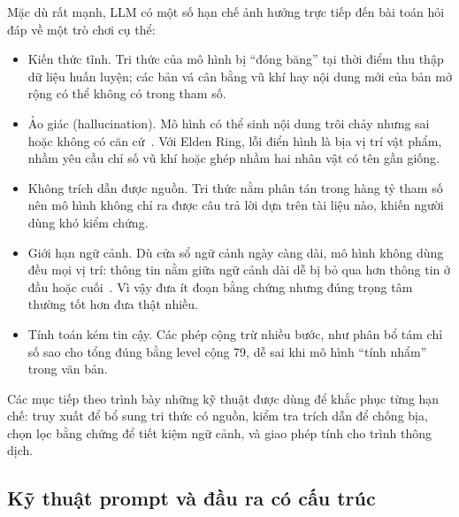 Mặc dù rất mạnh, LLM có một số hạn chế ảnh hưởng trực tiếp đến bài toán hỏi đáp về một trò chơi cụ thể:
\begin{itemize}
    \item Kiến thức tĩnh. Tri thức của mô hình bị ``đóng băng'' tại thời điểm thu thập dữ liệu huấn luyện; các bản vá cân bằng vũ khí hay nội dung mới của bản mở rộng có thể không có trong tham số.
    \item Ảo giác (hallucination). Mô hình có thể sinh nội dung trôi chảy nhưng sai hoặc không có căn cứ~\cite{ji2023hallucination}. Với Elden Ring, lỗi điển hình là bịa vị trí vật phẩm, nhầm yêu cầu chỉ số vũ khí hoặc ghép nhầm hai nhân vật có tên gần giống.
    \item Không trích dẫn được nguồn. Tri thức nằm phân tán trong hàng tỷ tham số nên mô hình không chỉ ra được câu trả lời dựa trên tài liệu nào, khiến người dùng khó kiểm chứng.
    \item Giới hạn ngữ cảnh. Dù cửa sổ ngữ cảnh ngày càng dài, mô hình không dùng đều mọi vị trí: thông tin nằm giữa ngữ cảnh dài dễ bị bỏ qua hơn thông tin ở đầu hoặc cuối~\cite{liu2024lost}. Vì vậy đưa ít đoạn bằng chứng nhưng đúng trọng tâm thường tốt hơn đưa thật nhiều.
    \item Tính toán kém tin cậy. Các phép cộng trừ nhiều bước, như phân bổ tám chỉ số sao cho tổng đúng bằng level cộng 79, dễ sai khi mô hình ``tính nhẩm'' trong văn bản.
\end{itemize}
Các mục tiếp theo trình bày những kỹ thuật được dùng để khắc phục từng hạn chế: truy xuất để bổ sung tri thức có nguồn, kiểm tra trích dẫn để chống bịa, chọn lọc bằng chứng để tiết kiệm ngữ cảnh, và giao phép tính cho trình thông dịch.

\subsection{Kỹ thuật prompt và đầu ra có cấu trúc}
\label{sec:prompting}

